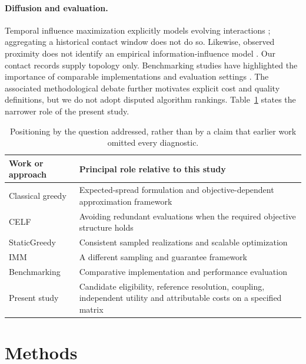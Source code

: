 \documentclass[smallextended]{svjour3}
\begin{document}
\paragraph{Diffusion and evaluation.}
Temporal influence maximization explicitly models evolving interactions \cite{ref11}; aggregating a historical contact window does not do so. Likewise, observed proximity does not identify an empirical information-influence model \cite{ref15}. Our contact records supply topology only. Benchmarking studies have highlighted the importance of comparable implementations and evaluation settings \cite{ref16}. The associated methodological debate further motivates explicit cost and quality definitions, but we do not adopt disputed algorithm rankings. Table~\ref{tab:position} states the narrower role of the present study.

\begin{table}[t]
\caption{Positioning by the question addressed, rather than by a claim that earlier work omitted every diagnostic.}\label{tab:position}
\begin{tabularx}{\linewidth}{lX}
\toprule
Work or approach & Principal role relative to this study \\
\midrule
Classical greedy \cite{ref1} & Expected-spread formulation and objective-dependent approximation framework \\
CELF \cite{ref7} & Avoiding redundant evaluations when the required objective structure holds \\
StaticGreedy \cite{ref8} & Consistent sampled realizations and scalable optimization \\
IMM \cite{ref2} & A different sampling and guarantee framework \\
Benchmarking \cite{ref16} & Comparative implementation and performance evaluation \\
Present study & Candidate eligibility, reference resolution, coupling, independent utility and attributable costs on a specified matrix \\
\bottomrule
\end{tabularx}
\end{table}

\section{Methods}
\end{document}
